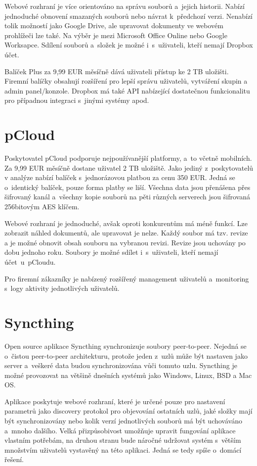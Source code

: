 Webové rozhraní je více orientováno na správu souborů a jejich historii. Nabízí jednoduché obnovení smazaných souborů nebo návrat k předchozí verzi.
Nenabízí tolik možností jako Google Drive, ale upravovat dokumenty ve webovém prohlížeči lze také. Na výběr je mezi Microsoft Office Online nebo Google Worksapce.
Sdílení souborů a složek je možné i s uživateli, kteří nemají Dropbox účet.

Balíček Plus za 9,99 EUR měsíčně dává uživateli přístup ke 2 TB uložišti. Firemní balíčky obsahují rozšíření pro lepší správu uživatelů, vytváření skupin
a admin panel/konzole. Dropbox má také API nabízející dostatečnou funkcionalitu pro případnou integraci s jinými systémy apod.\cite{Dropbox}

\section{pCloud}

Poskytovatel pCloud podporuje nejpoužívanější platformy, a to včetně mobilních. Za 9,99 EUR měsíčně dostane uživatel 2 TB uložiště. Jako jediný z poskytovatelů
v analýze nabízí balíček s jednorázovou platbou za cenu 350 EUR. Jedná se o identický balíček, pouze forma platby se liší. Všechna data jsou přenášena přes
šifrovaný kanál a všechny kopie souborů na pěti různých serverech jsou šifrovaná 256bitovým AES klíčem.\cite{pCloud}

Webové rozhraní je jednoduché, avšak oproti konkurentům má méně funkcí. Lze zobrazit náhled dokumentů, ale upravovat je nelze. Každý soubor má tzv. revize 
a je možné obnovit obsah souboru na vybranou revizi. Revize jsou uchovány po dobu jednoho roku. Soubory je možné sdílet i s uživateli, kteří nemají účet u pCloudu. 

Pro firemní zákazníky je nabízený rozšířený management uživatelů a monitoring s logy aktivity jednotlivých uživatelů.

\section{Syncthing}

Open source aplikace Syncthing synchronizuje soubory peer-to-peer. Nejedná se o čistou peer-to-peer architekturu, protože jeden z uzlů může být
nastaven jako server a veškeré data budou synchronizována vůči tomuto uzlu. Syncthing je možné provozovat na většině dnešních systémů jako Windows, Linux, BSD a
Mac OS.\cite{Syncthing}

Aplikace poskytuje webové rozhraní, které je určené pouze pro nastavení parametrů jako discovery protokol pro objevování ostatních uzlů, jaké složky mají být synchronizovány
nebo kolik verzí jednotlivých souborů má být uchováváno a mnoho dalšího. Velká přizpůsobivost umožňuje upravit fungování aplikace vlastním potřebám, na druhou
stranu bude náročné udržovat systém s větším množstvím uživatelů vystavěný na této aplikaci. Jedná se tedy spíše o domácí řešení.

